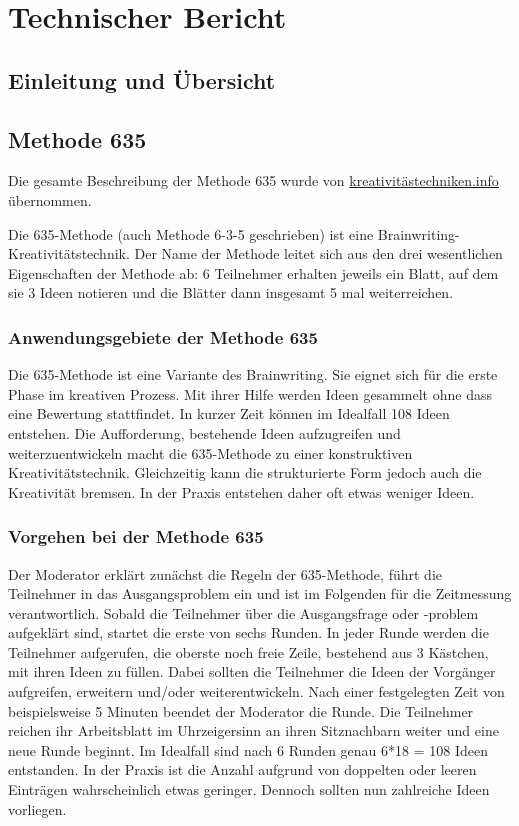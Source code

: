 \section{Technischer Bericht}

\subsection{Einleitung und Übersicht}


\subsection{Methode 635} \label{subsec:methode_635_desc}
Die gesamte Beschreibung der Methode 635 wurde von \href{https://kreativitätstechniken.info/6-3-5-methode/}{kreativitästechniken.info} übernommen.


Die 635-Methode (auch Methode 6-3-5 geschrieben) ist eine Brainwriting-Kre\-ati\-vi\-täts\-technik. Der Name der Methode leitet sich aus den drei wesentlichen Eigenschaften der Methode ab: 6 Teilnehmer erhalten jeweils ein Blatt, auf dem sie 3 Ideen notieren und die Blätter dann insgesamt 5 mal weiterreichen.

\subsubsection*{Anwendungsgebiete der Methode 635}
Die 635-Methode ist eine Variante des Brainwriting. Sie eignet sich für die erste Phase im kreativen Prozess. Mit ihrer Hilfe werden Ideen gesammelt ohne dass eine Bewertung stattfindet. In kurzer Zeit können im Idealfall 108 Ideen entstehen. Die Aufforderung, bestehende Ideen aufzugreifen und weiterzuentwickeln macht die 635-Methode zu einer konstruktiven Kreativitätstechnik. Gleichzeitig kann die strukturierte Form jedoch auch die Kreativität bremsen. In der Praxis entstehen daher oft etwas weniger Ideen.

\subsubsection*{Vorgehen bei der Methode 635}
Der Moderator erklärt zunächst die Regeln der 635-Methode, führt die Teilnehmer in das Ausgangsproblem ein und ist im Folgenden für die Zeitmessung verantwortlich. Sobald die Teilnehmer über die Ausgangsfrage oder -problem aufgeklärt sind, startet die erste von sechs Runden. In jeder Runde werden die Teilnehmer aufgerufen, die oberste noch freie Zeile, bestehend aus 3 Kästchen, mit ihren Ideen zu füllen. Dabei sollten die Teilnehmer die Ideen der Vorgänger aufgreifen, erweitern und/oder weiterentwickeln. Nach einer festgelegten Zeit von beispielsweise 5 Minuten beendet der Moderator die Runde. Die Teilnehmer reichen ihr Arbeitsblatt im Uhrzeigersinn an ihren Sitznachbarn weiter und eine neue Runde beginnt. Im Idealfall sind nach 6 Runden genau 6*18 = 108 Ideen entstanden. In der Praxis ist die Anzahl aufgrund von doppelten oder leeren Einträgen wahrscheinlich etwas geringer. Dennoch sollten nun zahlreiche Ideen vorliegen.


